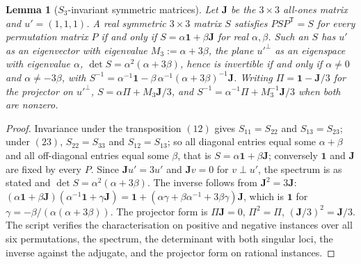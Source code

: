 \documentclass[11pt]{article}
\newtheorem{lemma}[theorem]{Lemma}
\theoremstyle{definition}
\newcommand{\J}{\mathbf{J}}
\begin{document}
\begin{lemma}[$S_{3}$-invariant symmetric matrices]\label{lem:s3}
Let $\J$ be the $3 \times 3$ all-ones matrix and $u' = (1,1,1)$. A real symmetric $3 \times 3$ matrix $S$ satisfies $PSP^{\mathsf{T}} = S$ for every permutation matrix $P$ if and only if $S = \alpha\mathbf{1} + \beta\J$ for real $\alpha, \beta$. Such an $S$ has $u'$ as an eigenvector with eigenvalue $M_{3} := \alpha + 3\beta$, the plane $u'^{\perp}$ as an eigenspace with eigenvalue $\alpha$, $\det S = \alpha^{2}(\alpha + 3\beta)$, hence is invertible if and only if $\alpha \neq 0$ and $\alpha \neq -3\beta$, with $S^{-1} = \alpha^{-1}\mathbf{1} - \beta\,\alpha^{-1}(\alpha + 3\beta)^{-1}\J$. Writing $\Pi = \mathbf{1} - \J/3$ for the projector on $u'^{\perp}$, $S = \alpha\Pi + M_{3}\J/3$, and $S^{-1} = \alpha^{-1}\Pi + M_{3}^{-1}\J/3$ when both are nonzero.
\end{lemma}

\begin{proof}
Invariance under the transposition $(12)$ gives $S_{11} = S_{22}$ and $S_{13} = S_{23}$; under $(23)$, $S_{22} = S_{33}$ and $S_{12} = S_{13}$; so all diagonal entries equal some $\alpha + \beta$ and all off-diagonal entries equal some $\beta$, that is $S = \alpha\mathbf{1} + \beta\J$; conversely $\mathbf{1}$ and $\J$ are fixed by every $P$. Since $\J u' = 3u'$ and $\J v = 0$ for $v \perp u'$, the spectrum is as stated and $\det S = \alpha^{2}(\alpha + 3\beta)$. The inverse follows from $\J^{2} = 3\J$: $(\alpha\mathbf{1} + \beta\J)(\alpha^{-1}\mathbf{1} + \gamma\J) = \mathbf{1} + (\alpha\gamma + \beta\alpha^{-1} + 3\beta\gamma)\J$, which is $\mathbf{1}$ for $\gamma = -\beta/(\alpha(\alpha + 3\beta))$. The projector form is $\Pi\J = 0$, $\Pi^{2} = \Pi$, $(\J/3)^{2} = \J/3$. The script verifies the characterisation on positive and negative instances over all six permutations, the spectrum, the determinant with both singular loci, the inverse against the adjugate, and the projector form on rational instances.
\end{proof}
\end{document}
